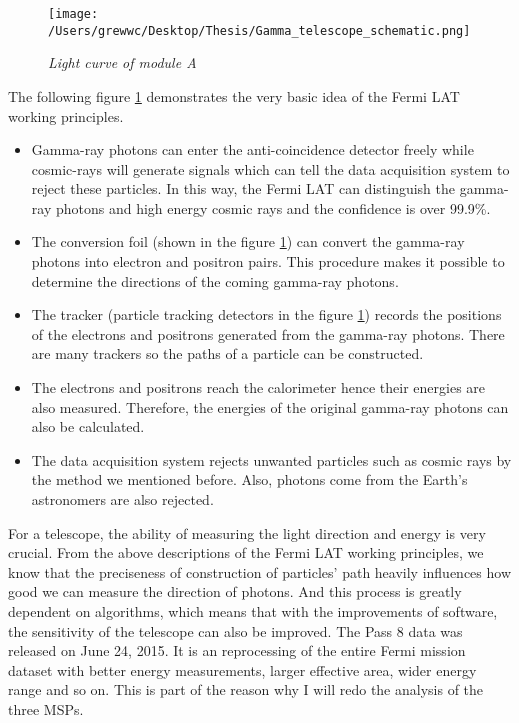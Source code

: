 \documentclass[12pt]{report}
\newcommand{\mycaption}[1]{\caption{\textit{\footnotesize #1}}}
\begin{document}
          
        \begin{figure}[!ht]  
          \begin{minipage}{1\textwidth}
            \begin{center} 
                \texttt{[image: /Users/grewwc/Desktop/Thesis/Gamma\_telescope\_schematic.png]}
                \mycaption{Light curve of module A}
                \label{fig:fermi schematic}
            \end{center}
          \end{minipage}
        \end{figure}
        The following figure \ref{fig:fermi schematic} demonstrates the very basic idea of the Fermi LAT working
        principles. \\

        \begin{itemize}
          \item Gamma-ray photons can enter the anti-coincidence detector freely while cosmic-rays will generate
            signals which can tell the data acquisition system to reject these particles. In this way, the 
            Fermi LAT can distinguish the gamma-ray photons and high energy cosmic rays and the confidence is 
            over 99.9\%. 
          \item The conversion foil (shown in the figure \ref{fig:fermi schematic}) can convert the 
            gamma-ray photons into electron and positron pairs. This procedure makes it possible to determine 
            the directions of the coming gamma-ray photons. 
          \item The tracker (particle tracking detectors in the figure \ref{fig:fermi schematic}) records the 
            positions of the electrons and positrons generated from the gamma-ray photons. There are many 
            trackers so the paths of a particle can be constructed.
          \item The electrons and positrons reach the calorimeter hence their energies are also measured.
            Therefore, the energies of the original gamma-ray photons can also be calculated. 
          \item The data acquisition system rejects unwanted particles such as cosmic rays by the method we mentioned 
            before. Also, photons come from the Earth's astronomers are also rejected. 
        \end{itemize}
      
        For a telescope, the ability of measuring the light direction and energy is very crucial. 
        From the above descriptions of the Fermi LAT working principles, we know that the preciseness of 
        construction of particles' path heavily influences how good we can measure the direction of photons. 
        And this process is greatly dependent on algorithms, which means that with the improvements of software,
        the sensitivity of the telescope can also be improved. The Pass 8 data was released on June 24, 2015.
        It is an reprocessing of the entire Fermi mission dataset with better energy measurements, larger effective 
        area, wider energy range and so on. This is part of the reason why I will redo the analysis of the three MSPs.
\end{document}
